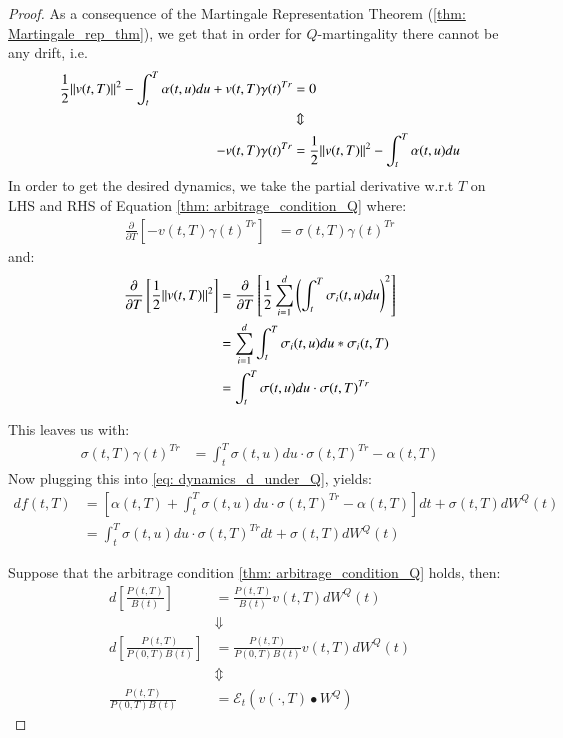 \begin{proof}
As a consequence of the Martingale Representation Theorem (\ref{thm: Martingale_rep_thm}), we get that in order for $Q$-martingality there cannot be any drift, i.e. 
\begin{align*}
\frac{1}{2}\norm{v(t,T)}^{2} - \int_{t}^{T}\alpha(t,u)du
+ v(t,T)\gamma(t)^{Tr} 
&= 0 \\ 
&\Updownarrow \\ 
-v(t,T)\gamma(t)^{Tr}
&= 
\frac{1}{2}\norm{v(t,T)}^{2} - \int_{t}^{T}\alpha(t,u)du
\end{align*}
In order to get the desired dynamics, we take the partial derivative w.r.t $T$ on LHS and RHS of Equation \ref{thm: arbitrage_condition_Q} where:
\begin{align*}
\frac{\partial}{\partial T}\left[
-v(t,T)\gamma(t)^{Tr}
\right]
&= 
\sigma(t,T)\gamma(t)^{Tr}
\end{align*}
and:
\begin{align*}
\frac{\partial}{\partial T}\left[
\frac{1}{2}\norm{
v(t,T)
}^{2} 
\right]
&= 
\frac{\partial}{\partial T}\left[
\frac{1}{2}\sum_{i=1}^{d}\left(
\int_{t}^{T}\sigma_{i}(t,u)du
\right)^{2}
\right] \\ 
&= \sum_{i=1}^{d}\int_{t}^{T}\sigma_{i}(t,u)du*\sigma_{i}(t,T) \\ 
&= \int_{t}^{T}\sigma(t,u)du\cdot \sigma(t,T)^{Tr}    
\end{align*}

This leaves us with: 
\begin{align*}
\sigma(t,T)\gamma(t)^{Tr} &= 
\int_{t}^{T}\sigma(t,u)du\cdot \sigma(t,T)^{Tr} 
- \alpha(t,T)    
\end{align*}
Now plugging this into \ref{eq: dynamics_d_under_Q}, yields: 
\begin{align*}
df(t,T) &= \left[
\alpha(t,T) + \int_{t}^{T}\sigma(t,u)du\cdot \sigma(t,T)^{Tr} 
- \alpha(t,T)
\right]dt 
+ \sigma(t,T)dW^{Q}(t) \\ 
&= 
\int_{t}^{T}\sigma(t,u)du\cdot \sigma(t,T)^{Tr}
dt 
+ \sigma(t,T)dW^{Q}(t)
\end{align*}

Suppose that the arbitrage condition \ref{thm: arbitrage_condition_Q} holds, then: 
\begin{align*}
d\left[
\frac{P(t,T)}{B(t)}
\right]
&= 
\frac{P(t,T)}{B(t)}v(t,T)dW^{Q}(t) \\ 
&\Downarrow \\ 
d\left[
\frac{P(t,T)}{P(0,T)B(t)}
\right] 
&= 
\frac{P(t,T)}{P(0,T)B(t)}v(t,T)dW^{Q}(t) \\ 
&\Updownarrow \\ 
\frac{P(t,T)}{P(0,T)B(t)} &= \mathcal{E}_{t}(v(\cdot, T)\bullet W^{Q})
\end{align*}
\end{proof}

